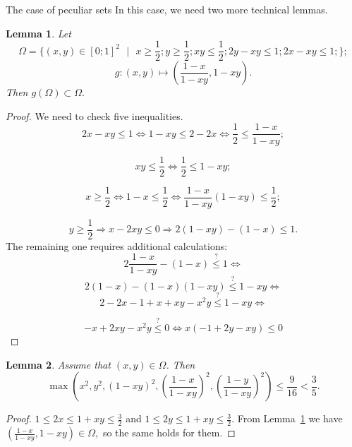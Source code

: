 \documentclass[12pt]{article}
\newtheorem{lemma}{Lemma}[section]
\begin{document}
\begin{section}{The case of peculiar sets}
\label{s7}
    In this case, we need two more technical lemmas. 
    \begin{lemma}
    \label{omega}
        Let 
        $$
            \Omega = \{(x,y) \in [0;1]^{2} \text{ }\vert \text{ } x\geq \frac{1}{2}; y\geq\frac{1}{2};xy\leq \frac{1}{2};2y-xy\leq 1; 2x-xy\leq 1;  \};
        $$
        $$
            g:(x,y)\mapsto \left(\frac{1-x}{1-xy}, 1-xy\right ).
        $$
        Then $g(\Omega)\subset \Omega.$
    \end{lemma}
    
    \begin{proof}
        
        We need to check five inequalities.
        $$
            2x-xy\leq 1 \Leftrightarrow 1 - xy \leq 2 -2x \Leftrightarrow \frac{1}{2} \leq \frac{1-x}{1-xy};
        $$
    
        $$
            xy \leq \frac{1}{2} \Leftrightarrow \frac{1}{2}\leq 1 - xy;
        $$
    
        $$
            x\geq \frac{1}{2} \Leftrightarrow 1 - x \leq \frac{1}{2} \Leftrightarrow \frac{1-x}{1-xy}(1-xy)\leq \frac{1}{2};
        $$
    
        $$
            y\geq \frac{1}{2} \Rightarrow x-2xy\leq 0 \Rightarrow 2(1-xy) - (1-x) \leq 1.
        $$
       The remaining one requires additional calculations:
        $$
            2\frac{1-x}{1-xy} - (1-x) \stackrel{?}{\leq} 1 \Leftrightarrow 
        $$
        $$
            2(1-x)- (1-x)(1-xy) \stackrel{?}{\leq} 1 -xy \Leftrightarrow
        $$
        $$
            2-2x- 1+x+xy-x^2y  \stackrel{?}{\leq} 1 -xy \Leftrightarrow
        $$
    
          $$
            -x + 2xy-x^2y  \stackrel{?}{\leq} 0 \Leftrightarrow x(-1 + 2y-xy)  
     \leq 0 
        $$
    \end{proof}
    
    \begin{lemma}
    \label{lemma7.2}
        Assume that  $(x,y)\in \Omega$. Then 
        $$
            \max \left(x^{2},y^{2},(1-xy)^{2}, \left(\frac{1-x}{1-xy}\right)^{2}, \left(\frac{1-y}{1-xy}\right)^{2}\right)\leq \frac{9}{16} < \frac{3}{5}.
        $$
    \end{lemma}
    
    \begin{proof}
        $1\leq 2x \leq 1 + xy \leq \frac{3}{2}$ and  $1\leq 2y \leq 1 + xy \leq \frac{3}{2}$.   From Lemma~\ref{omega} we have $  \left(\frac{1-x}{1-xy}, 1-xy\right ) \in \Omega, $ so the same holds for them. 
        

\end{proof}
\end{section}
\end{document}
